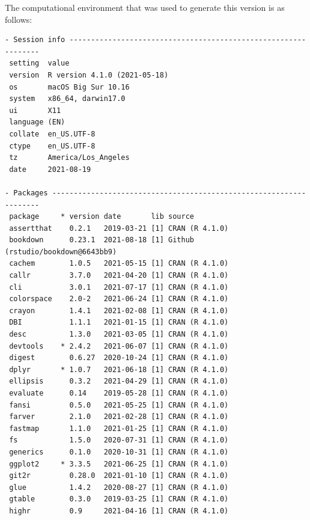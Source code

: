 \documentclass [11pt, proquest] {uwthesis}[2015/03/03]
\begin{document}
The computational environment that was used to generate this version is as follows:
\begin{verbatim}
- Session info ---------------------------------------------------------------
 setting  value                       
 version  R version 4.1.0 (2021-05-18)
 os       macOS Big Sur 10.16         
 system   x86_64, darwin17.0          
 ui       X11                         
 language (EN)                        
 collate  en_US.UTF-8                 
 ctype    en_US.UTF-8                 
 tz       America/Los_Angeles         
 date     2021-08-19                  

- Packages -------------------------------------------------------------------
 package     * version date       lib source                               
 assertthat    0.2.1   2019-03-21 [1] CRAN (R 4.1.0)                       
 bookdown      0.23.1  2021-08-18 [1] Github (rstudio/bookdown@6643bb9)    
 cachem        1.0.5   2021-05-15 [1] CRAN (R 4.1.0)                       
 callr         3.7.0   2021-04-20 [1] CRAN (R 4.1.0)                       
 cli           3.0.1   2021-07-17 [1] CRAN (R 4.1.0)                       
 colorspace    2.0-2   2021-06-24 [1] CRAN (R 4.1.0)                       
 crayon        1.4.1   2021-02-08 [1] CRAN (R 4.1.0)                       
 DBI           1.1.1   2021-01-15 [1] CRAN (R 4.1.0)                       
 desc          1.3.0   2021-03-05 [1] CRAN (R 4.1.0)                       
 devtools    * 2.4.2   2021-06-07 [1] CRAN (R 4.1.0)                       
 digest        0.6.27  2020-10-24 [1] CRAN (R 4.1.0)                       
 dplyr       * 1.0.7   2021-06-18 [1] CRAN (R 4.1.0)                       
 ellipsis      0.3.2   2021-04-29 [1] CRAN (R 4.1.0)                       
 evaluate      0.14    2019-05-28 [1] CRAN (R 4.1.0)                       
 fansi         0.5.0   2021-05-25 [1] CRAN (R 4.1.0)                       
 farver        2.1.0   2021-02-28 [1] CRAN (R 4.1.0)                       
 fastmap       1.1.0   2021-01-25 [1] CRAN (R 4.1.0)                       
 fs            1.5.0   2020-07-31 [1] CRAN (R 4.1.0)                       
 generics      0.1.0   2020-10-31 [1] CRAN (R 4.1.0)                       
 ggplot2     * 3.3.5   2021-06-25 [1] CRAN (R 4.1.0)                       
 git2r         0.28.0  2021-01-10 [1] CRAN (R 4.1.0)                       
 glue          1.4.2   2020-08-27 [1] CRAN (R 4.1.0)                       
 gtable        0.3.0   2019-03-25 [1] CRAN (R 4.1.0)                       
 highr         0.9     2021-04-16 [1] CRAN (R 4.1.0)                       

\end{verbatim}
\end{document}
